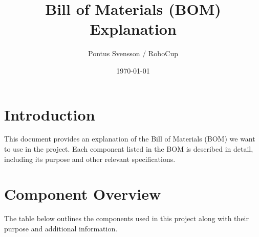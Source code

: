 \documentclass[a4paper,12pt]{article}
\title{Bill of Materials (BOM) Explanation}
\author{ Pontus Svensson / RoboCup }
\date{\today}
\begin{document}
\maketitle

\section*{Introduction}
This document provides an explanation of the Bill of Materials (BOM) we want to use in the project. Each component listed in the BOM is described in detail, including its purpose and other relevant specifications. 

\section*{Component Overview}
The table below outlines the components used in this project along with their purpose and additional information.
\end{document}
